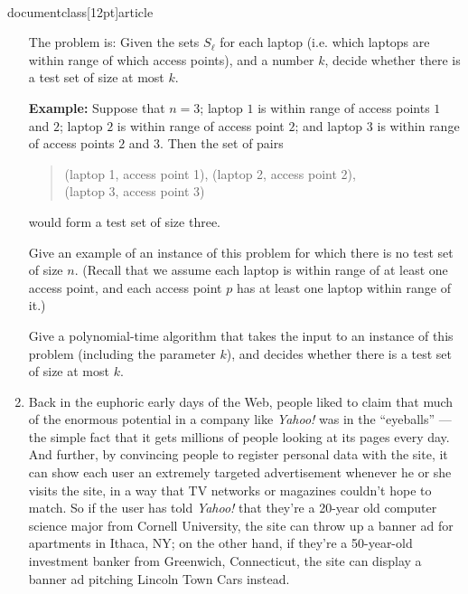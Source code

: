 \\documentclass[12pt]{article}
\begin{document}
\begin{enumerate}
The problem is: Given the sets $S_\ell$ for each laptop
(i.e. which laptops are within range of which access points),
and a number $k$, decide whether there is a test set of size at most $k$.

\bigskip
\bigskip
{\bf Example:} Suppose that $n = 3$;
laptop $1$ is within range of access points $1$ and $2$;
laptop $2$ is within range of access point $2$; and
laptop $3$ is within range of access points $2$ and $3$.
Then the set of pairs
\begin{quote}
(laptop 1, access point 1), (laptop 2, access point 2), \\
(laptop 3, access point 3)
\end{quote}
would form a test set of size three.

\bigskip
\bigskip

Give an example of an instance of this problem
for which there is no test set of size $n$.
(Recall that we assume each laptop is within range of at least
one access point, and each access point $p$ has at least
one laptop within range of it.)

Give a polynomial-time algorithm that takes the input
to an instance of this problem (including the parameter $k$),
and decides whether there is a test set of size at most $k$.



\item 

Back in the euphoric early days of the Web, 
people liked to claim that
much of the enormous potential in a company like {\em Yahoo!} was
in the ``eyeballs'' --- the simple fact that it gets millions
of people looking at its pages every day.
And further, by convincing people to register personal data
with the site, it can show each user an extremely targeted
advertisement whenever he or she visits the site,
in a way that TV networks or magazines couldn't hope to match.
So if the user has told {\em Yahoo!} that they're
a 20-year old computer science major from
Cornell University, the site can throw up a banner ad
for apartments in Ithaca, NY; on the other hand,
if they're a 50-year-old investment banker from Greenwich, Connecticut,
the site can display a banner ad pitching Lincoln Town Cars instead.


\end{enumerate}
\end{document}
